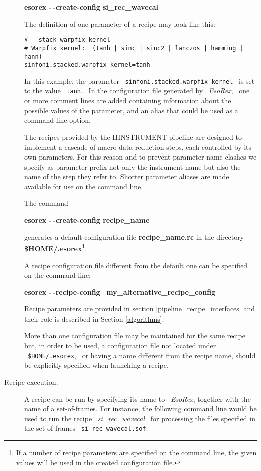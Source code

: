 \begin{description}
{\bf esorex -\,-create-config si\_rec\_wavecal}

The definition of one parameter of a recipe may look like this:
\begin{verbatim}
# --stack-warpfix_kernel
# Warpfix kernel:  (tanh | sinc | sinc2 | lanczos | hamming | hann)
sinfoni.stacked.warpfix_kernel=tanh
\end{verbatim}


In this example, the parameter \ {\tt sinfoni.stacked.warpfix\_kernel} 
\ is set to the value \ {\tt tanh}. \ In the configuration file
generated by \ {\it EsoRex}, \ one or more comment lines are added
containing information about the possible values of the parameter, and
an alias that could be used as a command line option.  

The recipes provided by the IIINSTRUMENT pipeline are designed to implement 
a cascade of macro data reduction steps, each controlled by 
its own parameters.
For this reason and to prevent parameter name clashes we specify as 
parameter prefix not only the instrument name but also the name of the 
step they refer to. Shorter parameter aliases are made available for 
use on the command line.

The command

{\bf esorex -\,-create-config recipe\_name}

generates a default configuration file {\bf recipe\_name.rc} in the directory 
{\bf \${HOME}/.esorex}\footnote{If a number of recipe parameters are 
specified on the command line, the given values will be used in the
created configuration file.}.

A recipe configuration file different from the default one can be 
specified on the command line:

{\bf esorex -\,-recipe-config=my\_alternative\_recipe\_config}


Recipe parameters are provided in section \ref{pipeline_recipe_interfaces} 
and their role is described in Section \ref{algorithms}.

More than one configuration file may be maintained for the same recipe
but, in order to be used, a configuration file not located under 
\ {\tt \$HOME/.esorex}, \ or having a name different from the recipe 
name, should be explicitly specified when launching a recipe.


\item [Recipe execution:]


A recipe can be run by specifying its name to 
\ {\it EsoRex}, together with the name of a set-of-frames.
For instance, the
following command line would be used to run the recipe \ {\it si\_rec\_wavecal}
\ for processing the files specified in the set-of-frames 
\ {\tt si\_rec\_wavecal.sof}:


\end{description}
